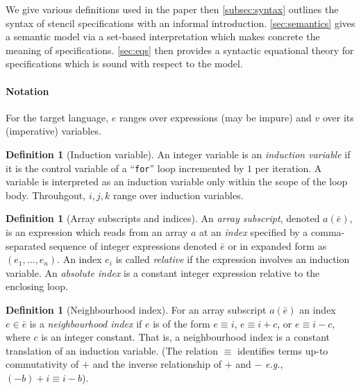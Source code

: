 \documentclass[10pt,preprint]{sigplanconf}
\newcounter{block}
\theoremstyle{definition}
\newtheorem{definition}[block]{Definition}
\newcommand{\eg}{\emph{e.g.}}
\begin{document}
We give various definitions used in the paper then
\cref{subsec:syntax} outlines the syntax of stencil specifications
with an informal introduction. \cref{sec:semantics}
gives a semantic model via a set-based interpretation which makes
concrete the meaning of specifications. \cref{sec:eqs} then provides
a syntactic equational theory for specifications which is
sound with respect to the model.


\paragraph{Notation}

\renewcommand*{\arraystretch}{0.8}
For the target language, $e$ ranges over expressions (may be impure) and $v$
over its (imperative) variables. %

\begin{definition}[Induction variable]
  An integer variable is an \emph{induction variable} if it is the control
  variable of a ``\texttt{for}'' loop incremented by $1$ per iteration. A variable
  is interpreted as an induction variable only within the scope of the loop
  body. Throuhgout, $i, j, k$ range over induction variables.
\end{definition}

\begin{definition}[Array subscripts and indices]
  An \emph{array subscript}, denoted $a(\bar{e})$, is an expression
  which reads from an array $a$ at an \emph{index} specified by a
  comma-separated sequence of integer expressions denoted $\bar{e}$ or
  in expanded form as $(e_1, \ldots, e_n)$. An index $e_i$
  is called \emph{relative} if the expression involves an induction
  variable.
  An \emph{absolute index} is a constant integer expression relative to the
  enclosing loop.
\end{definition}

\begin{definition}[Neighbourhood index]
\label{def:neighbour}
  For an array subscript $a(\bar{e})$ an index $e \in \bar{e}$ is a
  \emph{neighbourhood index} if $e$ is of the form $e \equiv i$, $e \equiv i +
  c$, or $e \equiv i - c$, where $c$ is an integer constant. That is, a
  neighbourhood index is a constant translation of an induction variable. (The
  relation $\equiv$ identifies terms up-to commutativity of $+$ and the inverse
  relationship of $+$ and $-$ \eg{}, $(-b) + i \equiv i - b$).
\end{definition}
\end{document}
